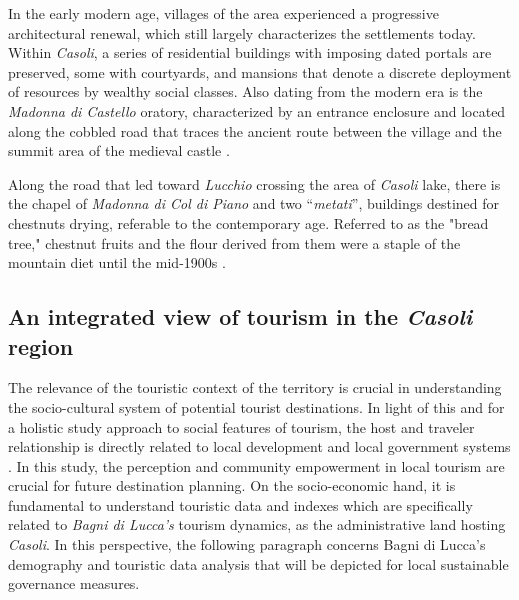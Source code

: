 \documentclass[sustainability,article,submit,pdftex,moreauthors]{Definitions/mdpi}
\begin{document}
In the early modern age, villages of the area experienced a progressive architectural renewal, which still largely characterizes the settlements today. Within \emph{Casoli}, a series of residential buildings with imposing dated portals are preserved, some with courtyards, and mansions that denote a discrete deployment of resources by wealthy social classes. Also dating from the modern era is the \textit{Madonna di Castello} oratory, characterized by an entrance enclosure and located along the cobbled road that traces the ancient route between the village and the summit area of the medieval castle \cite{gia96}.

Along the road that led toward \textit{Lucchio} crossing the area of \emph{Casoli} lake, there is the chapel of \textit{Madonna di Col di Piano} and two “\textit{metati}”, buildings destined for chestnuts drying, referable to the contemporary age. Referred to as the "bread tree," chestnut fruits and the flour derived from them were a staple of the mountain diet until the mid-1900s \cite{buc92, puc10}.


\subsection{An integrated view of tourism in the \emph{Casoli} region}


The relevance of the touristic context of the territory is crucial in understanding the socio-cultural system of potential tourist destinations. In light of this and for a holistic study approach to social features of tourism, the host and traveler relationship is directly related to local development and local government systems \cite{amo21}. In this study, the perception and community empowerment in local tourism are crucial for future destination planning.
On the socio-economic hand, it is fundamental to understand touristic data and indexes which are specifically related to \textit{Bagni di Lucca's} tourism dynamics, as the administrative land hosting \textit{Casoli}. 
In this perspective, the following paragraph concerns {Bagni di Lucca's} demography and touristic data analysis that will be depicted for local sustainable governance measures.

\end{document}
